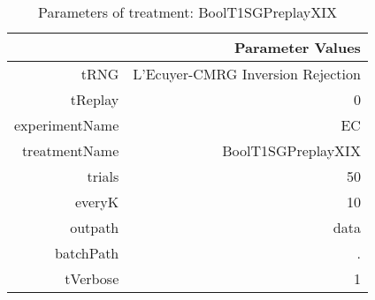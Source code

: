 \begin{table}[ht]
\centering
\begin{tabular}{rr}
  \hline
 & Parameter Values \\ 
  \hline
tRNG & L'Ecuyer-CMRG Inversion Rejection \\ 
  tReplay & 0 \\ 
  experimentName & EC \\ 
  treatmentName & BoolT1SGPreplayXIX \\ 
  trials & 50 \\ 
  everyK & 10 \\ 
  outpath & data \\ 
  batchPath & . \\ 
  tVerbose & 1 \\ 
   \hline
\end{tabular}
\caption{ Parameters of treatment: BoolT1SGPreplayXIX 
} 
\end{table}
